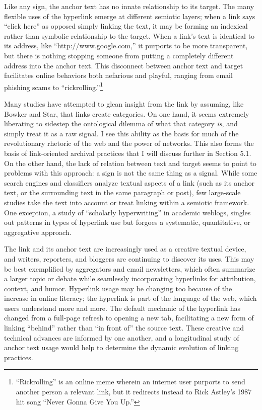 Like any sign, the anchor text has no innate relationship to its target. The many flexible uses of the hyperlink emerge at different semiotic layers; when a link says ``click here'' as opposed simply linking the text, it may be forming an indexical rather than symbolic relationship to the target. When a link's text is identical to its address, like ``http://www.google.com,'' it purports to be more transparent, but there is nothing stopping someone from putting a completely different address into the anchor text. This disconnect between anchor text and target facilitates online behaviors both nefarious and playful, ranging from email phishing scams to ``rickrolling.''\footnote{``Rickrolling'' is an online meme wherein an internet user purports to send another person a relevant link, but it redirects instead to Rick Astley's 1987 hit song ``Never Gonna Give You Up.''}

Many studies have attempted to glean insight from the link by assuming, like Bowker and Star, that links create categories. On one hand, it seems extremely liberating to sidestep the ontological dilemma of what that category \emph{is}, and simply treat it as a raw signal. I see this ability as the basis for much of the revolutionary rhetoric of the web and the power of networks. This also forms the basis of link-oriented archival practices that I will discuss further in Section 5.1. %
On the other hand, the lack of relation between text and target seems to point to problems with this approach: a sign is not the same thing as a signal. While some search engines and classifiers analyze textual aspects of a link (such as its anchor text, or the surrounding text in the same paragraph or post), few large-scale studies take the text into account or treat linking within a semiotic framework. One exception, a study of ``scholarly hyperwriting'' in academic weblogs, singles out patterns in types of hyperlink use but forgoes a systematic, quantitative, or aggregative approach.\autocite{luzon_scholarly_2009}

The link and its anchor text are increasingly used as a creative textual device, and writers, reporters, and bloggers are continuing to discover its uses. This may be best exemplified by aggregators and email newsletters, which often summarize a larger topic or debate while seamlessly incorporating hyperlinks for attribution, context, and humor. Hyperlink usage may be changing too because of the increase in online literacy; the hyperlink is part of the language of the web, which users understand more and more. The default mechanic of the hyperlink has changed from a full-page refresh to opening a new tab, facilitating a new form of linking ``behind'' rather than ``in front of'' the source text. These creative and technical advances are informed by one another, and a longitudinal study of anchor text usage would help to determine the dynamic evolution of linking practices.

